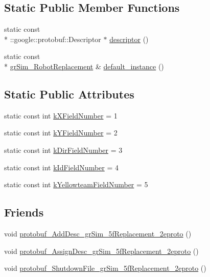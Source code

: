 \subsection*{Static Public Member Functions}
\begin{DoxyCompactItemize}
\item 
static const \\*
\-::google\-::protobuf\-::\-Descriptor $\ast$ \hyperlink{classgr_sim___robot_replacement_a6f22243aa85b0fc1654d857708acd559}{descriptor} ()
\item 
static const \\*
\hyperlink{classgr_sim___robot_replacement}{gr\-Sim\-\_\-\-Robot\-Replacement} \& \hyperlink{classgr_sim___robot_replacement_a1b52fb487cd7374099327f17424d91b7}{default\-\_\-instance} ()
\end{DoxyCompactItemize}
\subsection*{Static Public Attributes}
\begin{DoxyCompactItemize}
\item 
static const int \hyperlink{classgr_sim___robot_replacement_ad416758be49ddf14c0d378ffad2bb3b4}{k\-X\-Field\-Number} = 1
\item 
static const int \hyperlink{classgr_sim___robot_replacement_af925d6a8427605ebe46720d2bda5880c}{k\-Y\-Field\-Number} = 2
\item 
static const int \hyperlink{classgr_sim___robot_replacement_a224822ecf1ce8b045b8233442e926398}{k\-Dir\-Field\-Number} = 3
\item 
static const int \hyperlink{classgr_sim___robot_replacement_ac25017de2dc425372748cf90b9d0ee07}{k\-Id\-Field\-Number} = 4
\item 
static const int \hyperlink{classgr_sim___robot_replacement_a25e0cb584f870ec4c6d3fbe206628e9a}{k\-Yellowteam\-Field\-Number} = 5
\end{DoxyCompactItemize}
\subsection*{Friends}
\begin{DoxyCompactItemize}
\item 
void \hyperlink{classgr_sim___robot_replacement_a9ac32e27f85f830ef01942ad673705b7}{protobuf\-\_\-\-Add\-Desc\-\_\-gr\-Sim\-\_\-5f\-Replacement\-\_\-2eproto} ()
\item 
void \hyperlink{classgr_sim___robot_replacement_a973404afe16402ca581cbe74d3e0a674}{protobuf\-\_\-\-Assign\-Desc\-\_\-gr\-Sim\-\_\-5f\-Replacement\-\_\-2eproto} ()
\item 
void \hyperlink{classgr_sim___robot_replacement_a495a36d90087973987ea2ddca30870c8}{protobuf\-\_\-\-Shutdown\-File\-\_\-gr\-Sim\-\_\-5f\-Replacement\-\_\-2eproto} ()
\end{DoxyCompactItemize}


